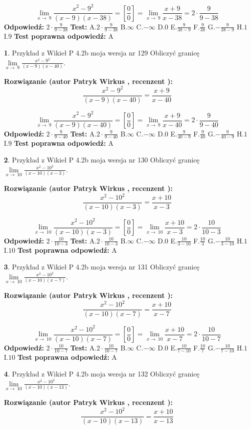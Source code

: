 \documentclass[12pt, a4paper]{article}
\theoremstyle{definition} %
\newtheorem{zad}{}
\newcommand{\zadStart}[1]{\begin{zad}#1\newline}
\newcommand{\zadStop}{\end{zad}}
\newcommand{\rozwStart}[2]{\noindent \textbf{Rozwiązanie (autor #1 , recenzent #2): }\newline}
\newcommand{\rozwStop}{\newline}
\newcommand{\odpStart}{\noindent \textbf{Odpowiedź:}\newline}
\newcommand{\odpStop}{\newline}
\newcommand{\testStart}{\noindent \textbf{Test:}\newline}
\newcommand{\testStop}{\newline}
\newcommand{\kluczStart}{\noindent \textbf{Test poprawna odpowiedź:}\newline}
\newcommand{\kluczStop}{\newline}
\begin{document}
$$\lim\limits_{x\to\ 9}\frac{x^{2}-9^{2}}{(x-9)(x-38)}=[\frac{0}{0}]=\lim\limits_{x\to\ 9}\frac{x+9}{x-38}=2 \cdot \frac{9}{9-38}$$
\rozwStop
\odpStart
$2 \cdot \frac{9}{9-38}$
\odpStop
\testStart
A.$2 \cdot \frac{9}{9-38}$
B.$\infty$
C.$-\infty$
D.$0$
E.$\frac{9}{38-9}$
F.$\frac{9}{38}$
G.$-\frac{9}{38-9}$
H.$1$
I.$9$
\testStop
\kluczStart
A
\kluczStop



\zadStart{Przykład z Wikieł P 4.2b moja wersja nr 129}
Obliczyć granicę $\lim\limits_{x\to\ 9}\frac{x^{2}-9^{2}}{(x-9)(x-40)}$.
\zadStop
\rozwStart{Patryk Wirkus}{}
$$\frac{x^{2}-9^{2}}{(x-9)(x-40)}=\frac{x+9}{x-40}$$

$$\lim\limits_{x\to\ 9}\frac{x^{2}-9^{2}}{(x-9)(x-40)}=[\frac{0}{0}]=\lim\limits_{x\to\ 9}\frac{x+9}{x-40}=2 \cdot \frac{9}{9-40}$$
\rozwStop
\odpStart
$2 \cdot \frac{9}{9-40}$
\odpStop
\testStart
A.$2 \cdot \frac{9}{9-40}$
B.$\infty$
C.$-\infty$
D.$0$
E.$\frac{9}{40-9}$
F.$\frac{9}{40}$
G.$-\frac{9}{40-9}$
H.$1$
I.$9$
\testStop
\kluczStart
A
\kluczStop



\zadStart{Przykład z Wikieł P 4.2b moja wersja nr 130}
Obliczyć granicę $\lim\limits_{x\to\ 10}\frac{x^{2}-10^{2}}{(x-10)(x-3)}$.
\zadStop
\rozwStart{Patryk Wirkus}{}
$$\frac{x^{2}-10^{2}}{(x-10)(x-3)}=\frac{x+10}{x-3}$$

$$\lim\limits_{x\to\ 10}\frac{x^{2}-10^{2}}{(x-10)(x-3)}=[\frac{0}{0}]=\lim\limits_{x\to\ 10}\frac{x+10}{x-3}=2 \cdot \frac{10}{10-3}$$
\rozwStop
\odpStart
$2 \cdot \frac{10}{10-3}$
\odpStop
\testStart
A.$2 \cdot \frac{10}{10-3}$
B.$\infty$
C.$-\infty$
D.$0$
E.$\frac{10}{3-10}$
F.$\frac{10}{3}$
G.$-\frac{10}{3-10}$
H.$1$
I.$10$
\testStop
\kluczStart
A
\kluczStop



\zadStart{Przykład z Wikieł P 4.2b moja wersja nr 131}
Obliczyć granicę $\lim\limits_{x\to\ 10}\frac{x^{2}-10^{2}}{(x-10)(x-7)}$.
\zadStop
\rozwStart{Patryk Wirkus}{}
$$\frac{x^{2}-10^{2}}{(x-10)(x-7)}=\frac{x+10}{x-7}$$

$$\lim\limits_{x\to\ 10}\frac{x^{2}-10^{2}}{(x-10)(x-7)}=[\frac{0}{0}]=\lim\limits_{x\to\ 10}\frac{x+10}{x-7}=2 \cdot \frac{10}{10-7}$$
\rozwStop
\odpStart
$2 \cdot \frac{10}{10-7}$
\odpStop
\testStart
A.$2 \cdot \frac{10}{10-7}$
B.$\infty$
C.$-\infty$
D.$0$
E.$\frac{10}{7-10}$
F.$\frac{10}{7}$
G.$-\frac{10}{7-10}$
H.$1$
I.$10$
\testStop
\kluczStart
A
\kluczStop



\zadStart{Przykład z Wikieł P 4.2b moja wersja nr 132}
Obliczyć granicę $\lim\limits_{x\to\ 10}\frac{x^{2}-10^{2}}{(x-10)(x-13)}$.
\zadStop
\rozwStart{Patryk Wirkus}{}
$$\frac{x^{2}-10^{2}}{(x-10)(x-13)}=\frac{x+10}{x-13}$$
\end{document}
